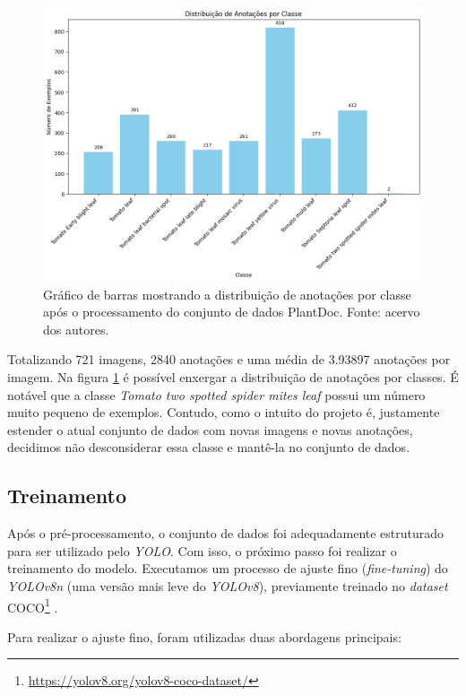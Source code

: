 \begin{figure}[htb!]
    \centering
    \includegraphics[width=1\linewidth]{images/distribuicao_anotacoes.png}
    \caption{\label{fig:distribuicao-ann-cls} Gráfico de barras mostrando a distribuição de anotações por classe após o processamento do conjunto de dados PlantDoc. Fonte: acervo dos autores.}
\end{figure}

Totalizando 721 imagens, 2840 anotações e uma média de 3.93897 anotações por imagem. Na figura \ref{fig:distribuicao-ann-cls} é possível enxergar a distribuição de anotações por classes. É notável que a classe \emph{Tomato two spotted spider mites leaf} possui um número muito pequeno de exemplos. Contudo, como o intuito do projeto é, justamente estender o atual conjunto de dados com novas imagens e novas anotações, decidimos não desconsiderar essa classe e mantê-la no conjunto de dados.

\subsection{Treinamento}
\label{sec:treinamento2}
Após o pré-processamento, o conjunto de dados foi adequadamente estruturado para ser utilizado pelo \emph{YOLO}. Com isso, o próximo passo foi realizar o treinamento do modelo. Executamos um processo de ajuste fino (\emph{fine-tuning}) do \emph{YOLOv8n} (uma versão mais leve do \emph{YOLOv8}), previamente treinado no \emph{dataset} COCO\footnote{\url{https://yolov8.org/yolov8-coco-dataset/}} \cite{COCO}.

Para realizar o ajuste fino, foram utilizadas duas abordagens principais:

